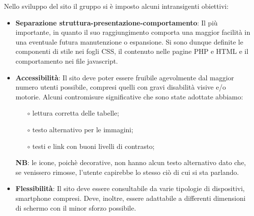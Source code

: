 Nello sviluppo del sito il gruppo si è imposto alcuni intransigenti obiettivi:
\begin{itemize}
    \item \textbf{Separazione struttura-presentazione-comportamento}: Il più importante, in quanto il suo raggiungimento
    comporta una maggior facilità in una eventuale futura manutenzione o espansione.
    Si sono dunque definite le componenti di stile nei fogli CSS, il contenuto nelle pagine PHP e HTML e il comportamento nei file javascript.
    \item \textbf{Accessibilità}: Il sito deve poter essere fruibile agevolmente dal maggior
    numero utenti possibile, compresi quelli con gravi disabilità visive e/o
    motorie. Alcuni contromisure significative che sono state adottate abbiamo:
    \begin{itemize}
        \item[$\circ$] lettura corretta delle tabelle;
        \item[$\circ$] testo alternativo per le immagini;
        \item[$\circ$] testi e link con buoni livelli di contrasto;
    \end{itemize}
    \textbf{NB}: le icone, poichè decorative, non hanno alcun testo alternativo dato che, se venissero rimosse, l'utente
    capirebbe lo stesso ciò di cui si sta parlando.
    \item \textbf{Flessibilità}: Il sito deve essere consultabile da varie tipologie di dispositivi,
    smartphone compresi. Deve, inoltre, essere adattabile a differenti dimensioni
    di schermo con il minor sforzo possibile.
\end{itemize}
